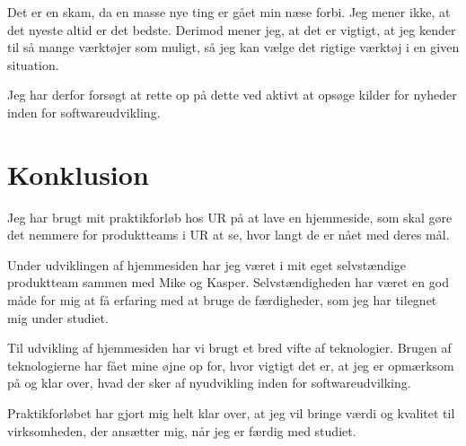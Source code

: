 \documentclass[a4paper]{article}
\begin{document}
Det er en skam, da en masse nye ting er gået min næse forbi.
Jeg mener ikke, at det nyeste altid er det bedste.
Derimod mener jeg, at det er vigtigt,
at jeg kender til så mange værktøjer som muligt,
så jeg kan vælge det rigtige værktøj i en given situation.

Jeg har derfor forsøgt at rette op på dette ved aktivt at opsøge kilder for nyheder inden for softwareudvikling.

\newpage
\section{Konklusion}
Jeg har brugt mit praktikforløb hos UR på at lave en hjemmeside,
som skal gøre det nemmere for produktteams i UR at se,
hvor langt de er nået med deres mål.

Under udviklingen af hjemmesiden har jeg været i mit eget selvstændige produktteam sammen med Mike og Kasper.
Selvstændigheden har været en god måde for mig at få erfaring med at bruge de færdigheder,
som jeg har tilegnet mig under studiet.

Til udvikling af hjemmesiden har vi brugt et bred vifte af teknologier.
Brugen af teknologierne har fået mine øjne op for, hvor vigtigt det er,
at jeg er opmærksom på og klar over,
hvad der sker af nyudvikling inden for softwareudvilking.

Praktikforløbet har gjort mig helt klar over,
at jeg vil bringe værdi og kvalitet til virksomheden,
der ansætter mig,
når jeg er færdig med studiet.
\end{document}
